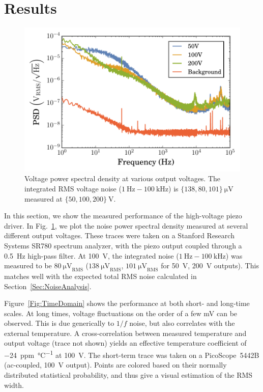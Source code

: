 \documentclass[aip,rsi,reprint]{revtex4-1} %
\begin{document}
\section{Results}
\label{Sec:Results}
\begin{figure}[t]
\includegraphics[width=\columnwidth]{fig/VoltagePSD.pdf}
\caption{Voltage power spectral density at various output voltages. The integrated RMS voltage noise ($\SI{1}{\hertz} - \SI{100}{\kilo\hertz}$) is $\{138, 80, 101\}~\si{\micro\volt}$ measured at  $\{50, 100, 200\}~\si{\volt}$. \label{Fig:PSD}}
\end{figure}


In this section, we show the measured performance of the high-voltage piezo driver.
In Fig.~\ref{Fig:PSD}, we plot the noise power spectral density measured at several different output voltages.
These traces were taken on a Stanford Research Systems SR780 spectrum analyzer, with the piezo output coupled through a \SI{0.5}{\hertz} high-pass filter. 
At \SI{100}{\volt}, the integrated noise ($\SI{1}{\hertz} - \SI{100}{\kilo\hertz}$) was measured to be $\SI{80}{\micro\volt}_\text{RMS}$ ($\SI{138}{\micro\volt}_\text{RMS}$, $\SI{101}{\micro\volt}_\text{RMS}$ for \SI{50}{\volt}, \SI{200}{\volt} outputs). 
This matches well with the expected total RMS noise calculated in Section~\ref{Sec:NoiseAnalysis}.


Figure~\ref{Fig:TimeDomain} shows the performance at both short- and long-time scales.
At long times, voltage fluctuations on the order of a few \si{\milli\volt} can be observed.
This is due generically to $1/f$ noise, but also correlates with the external temperature.
A cross-correlation between measured temperature and output voltage (trace not shown) yields an effective temperature coefficient of \SI[per-mode=symbol]{-24}{ppm\per\celsius} at \SI{100}{\volt}.
The short-term trace was taken on a PicoScope~5442B (ac-coupled, \SI{100}{\volt} output).
Points are colored based on their normally distributed statistical probability, and thus give a visual estimation of the RMS width.
\end{document}
